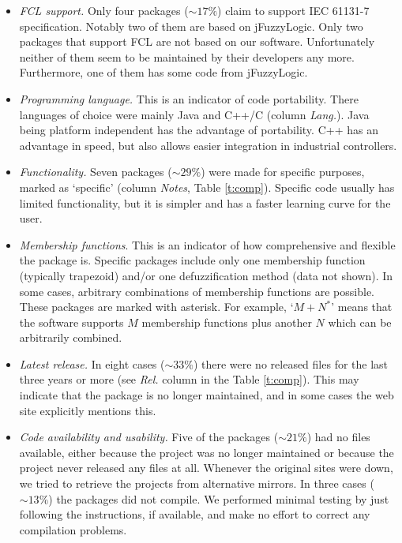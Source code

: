 \documentclass[conference]{IEEEtran}
\begin{document}
\begin{itemize}
	\item \textit{FCL support.} Only four packages ($\sim 17\%$) claim to support IEC 61131-7 specification. 
	Notably two of them are based on jFuzzyLogic. 
	Only two packages that support FCL are not based on our software. Unfortunately neither of them seem to be maintained by their developers any more. 
	Furthermore, one of them has some code from jFuzzyLogic.

	\item \textit{Programming language.} This is an indicator of code portability. 
	There languages of choice were mainly Java and C++/C (column \textit{Lang.}). 
	Java being platform independent has the advantage of portability. 
	C++ has an advantage in speed, but also allows easier integration in industrial controllers.
	
	\item \textit{Functionality.} Seven packages ($\sim 29\%$) were made for specific purposes, marked as `specific' (column \textit{Notes}, Table \ref{t:comp}).
	Specific code usually has limited functionality, but it is simpler and has a faster learning curve for the user.

	\item \textit{Membership functions}. This is an indicator of how comprehensive and flexible the package is. 
	Specific packages include only one membership function (typically trapezoid) and/or one defuzzification method (data not shown).
	In some cases, arbitrary combinations of membership functions are possible. 
	These packages are marked with asterisk. 
	For example, `$M+N^*$' means that the software supports $M$ membership functions plus another $N$ which can be arbitrarily combined.
	
	\item \textit{Latest release.} In eight cases ($\sim 33\%$) there were no released files for the last three years or more (see \textit{Rel.} column in the Table \ref{t:comp}).
	This may indicate that the package is no longer maintained, and in some cases the web site explicitly mentions this.

	\item \textit{Code availability and usability.} Five of the packages ($\sim 21\%$) had no files available, either because the project was no longer maintained or because the project never released any files at all. 
	Whenever the original sites were down, we tried to retrieve the projects from alternative mirrors.
	In three cases ($\sim 13\%$) the packages did not compile. 
	We performed minimal testing by just following the instructions, if available, and make no effort to correct any compilation problems. 

\end{itemize}
\end{document}
